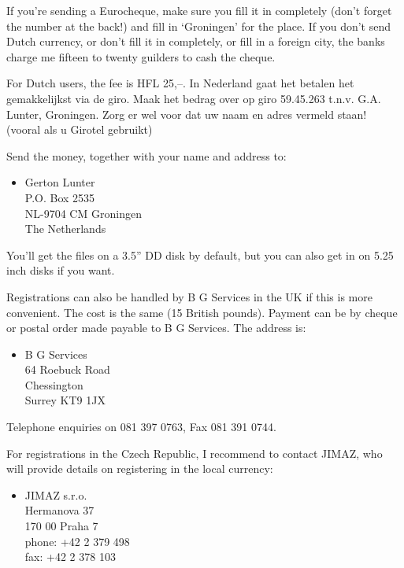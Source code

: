     If you're sending a Eurocheque, make sure you fill it in completely
    (don't forget the number at the back!) and fill in `Groningen' for the
    place.  If you don't send Dutch currency, or don't fill it in
    completely, or fill in a foreign city, the banks charge me fifteen to
    twenty guilders to cash the cheque.

    For Dutch users, the fee is HFL 25,--.  In Nederland gaat het betalen
    het gemakkelijkst via de giro.  Maak het bedrag over op giro 59.45.263
    t.n.v. G.A. Lunter, Groningen.  Zorg er wel voor dat uw naam en adres
    vermeld staan! (vooral als u Girotel gebruikt)

    Send the money, together with your name and address to:

\begin{itemize}
  \item[]
	Gerton Lunter \\
	P.O. Box 2535 \\
	NL-9704 CM  Groningen \\
	The Netherlands \\
\end{itemize}
    You'll get the files on a 3.5'' DD disk by default, but you can also get
    in on 5.25 inch disks if you want.

    Registrations can also be handled by B G Services in the UK if this is
    more convenient.  The cost is the same (15 British pounds).  Payment can
    be by cheque or postal order made payable to B G Services.  The address
    is:

\begin{itemize}
  \item[]
        B G Services \\
        64 Roebuck Road \\
        Chessington \\
        Surrey KT9 1JX \\
\end{itemize}
    Telephone enquiries on 081 397 0763, Fax 081 391 0744.

    For registrations in the Czech Republic, I recommend to contact JIMAZ,
    who will provide details on registering in the local currency:

\begin{itemize}
    \item[]
                JIMAZ s.r.o.\\
                Hermanova 37\\
                170 00 Praha 7\\
                phone: +42 2 379 498\\
                fax:   +42 2 378 103\\
\end{itemize}
\vfill



